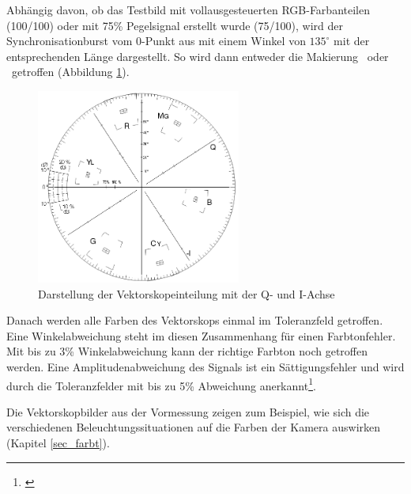 \noindent Abhängig davon, ob das Testbild mit vollausgesteuerten RGB-Farbanteilen (100/100) oder mit 75\% Pegelsignal erstellt wurde (75/100), wird der Synchronisationburst vom 0-Punkt aus mit einem Winkel von $135^\circ$ mit der entsprechenden Länge dargestellt. So wird dann entweder die Makierung \grqq\ oder \grqq\ getroffen (Abbildung \ref{b_vektorskop}).

\begin{figure}[H]     %
\centering
\includegraphics[width=0.6\textwidth]{bilder/vektorskop} 
\caption {Darstellung der Vektorskopeinteilung mit der Q- und I-Achse\protect\footnotemark}\label{b_vektorskop}
\end{figure}

Danach werden alle Farben des Vektorskops einmal im Toleranzfeld getroffen. Eine Winkelabweichung steht im diesen Zusammenhang für einen Farbtonfehler. Mit bis zu 3\% Winkelabweichung kann der richtige Farbton noch getroffen werden. Eine Amplitudenabweichung des Signals ist ein Sättigungsfehler und wird durch die Toleranzfelder mit bis zu 5\% Abweichung anerkannt\footnote{\cite[114]{schmidt}}.

Die Vektorskopbilder aus der Vormessung zeigen zum Beispiel, wie sich die verschiedenen Beleuchtungssituationen auf die Farben der Kamera auswirken (Kapitel \ref{sec_farbt}).

